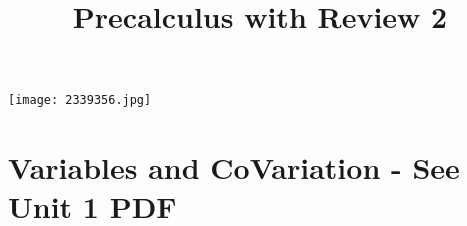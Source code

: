 \documentclass[handout]{xourse}
\title{Precalculus with Review 2}
\begin{document}
\texttt{[image: 2339356.jpg]}
\maketitle


	





\part{Variables and CoVariation - See Unit 1 PDF}  %
%
%
%
%
%
%
%
%
\end{document}
